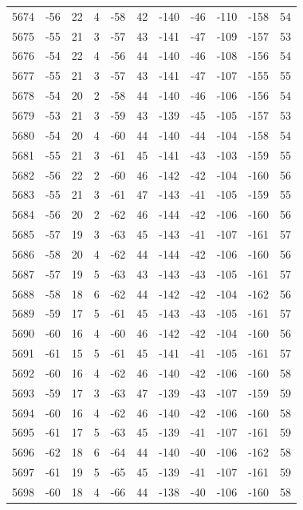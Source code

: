 \begin{table}[H]
\begin{tabular}{lllllllllll}
5674 & -56 & 22 & 4 & -58 & 42 & -140 & -46 & -110 & -158 & 54 \\
5675 & -55 & 21 & 3 & -57 & 43 & -141 & -47 & -109 & -157 & 53 \\
5676 & -54 & 22 & 4 & -56 & 44 & -140 & -46 & -108 & -156 & 54 \\
5677 & -55 & 21 & 3 & -57 & 43 & -141 & -47 & -107 & -155 & 55 \\
5678 & -54 & 20 & 2 & -58 & 44 & -140 & -46 & -106 & -156 & 54 \\
5679 & -53 & 21 & 3 & -59 & 43 & -139 & -45 & -105 & -157 & 53 \\
5680 & -54 & 20 & 4 & -60 & 44 & -140 & -44 & -104 & -158 & 54 \\
5681 & -55 & 21 & 3 & -61 & 45 & -141 & -43 & -103 & -159 & 55 \\
5682 & -56 & 22 & 2 & -60 & 46 & -142 & -42 & -104 & -160 & 56 \\
5683 & -55 & 21 & 3 & -61 & 47 & -143 & -41 & -105 & -159 & 55 \\
5684 & -56 & 20 & 2 & -62 & 46 & -144 & -42 & -106 & -160 & 56 \\
5685 & -57 & 19 & 3 & -63 & 45 & -143 & -41 & -107 & -161 & 57 \\
5686 & -58 & 20 & 4 & -62 & 44 & -144 & -42 & -106 & -160 & 56 \\
5687 & -57 & 19 & 5 & -63 & 43 & -143 & -43 & -105 & -161 & 57 \\
5688 & -58 & 18 & 6 & -62 & 44 & -142 & -42 & -104 & -162 & 56 \\
5689 & -59 & 17 & 5 & -61 & 45 & -143 & -43 & -105 & -161 & 57 \\
5690 & -60 & 16 & 4 & -60 & 46 & -142 & -42 & -104 & -160 & 56 \\
5691 & -61 & 15 & 5 & -61 & 45 & -141 & -41 & -105 & -161 & 57 \\
5692 & -60 & 16 & 4 & -62 & 46 & -140 & -42 & -106 & -160 & 58 \\
5693 & -59 & 17 & 3 & -63 & 47 & -139 & -43 & -107 & -159 & 59 \\
5694 & -60 & 16 & 4 & -62 & 46 & -140 & -42 & -106 & -160 & 58 \\
5695 & -61 & 17 & 5 & -63 & 45 & -139 & -41 & -107 & -161 & 59 \\
5696 & -62 & 18 & 6 & -64 & 44 & -140 & -40 & -106 & -162 & 58 \\
5697 & -61 & 19 & 5 & -65 & 45 & -139 & -41 & -107 & -161 & 59 \\
5698 & -60 & 18 & 4 & -66 & 44 & -138 & -40 & -106 & -160 & 58 \\

\end{tabular}
\end{table}
